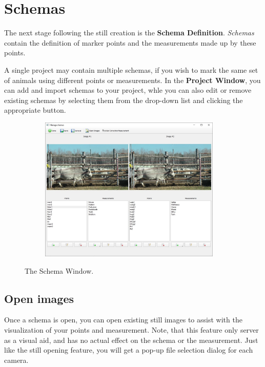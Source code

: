 \documentclass[10pt,a4paper,oneside]{report}             %
\begin{document}
\section{Schemas}

The next stage following the still creation is the \textbf{Schema Definition}. \textit{Schemas} contain the definition of marker points and the measurements made up by these points.

A single project may contain multiple schemas, if you wish to mark the same set of animals using different points or measurements. In the \textbf{Project Window}, you can add and import schemas to your project, whle you can also edit or remove existing schemas by selecting them from the drop-down list and clicking the appropriate button.

\begin{figure}[H]
	\centering
	\begin{subfigure}{\textwidth}
		\centering 
		\includegraphics[width=0.95\textwidth]{./images/SchemW.jpg}
	\end{subfigure}
	\caption[]
	{\small  The Schema Window.}
\end{figure} 

\subsection{Open images}

Once a schema is open, you can open existing still images to assist with the visualization of your points and measurement. Note, that this feature only server as a visual aid, and has no actual effect on the schema or the measurement. Just like the still opening feature, you will get a pop-up file selection dialog for each camera.
\end{document}
